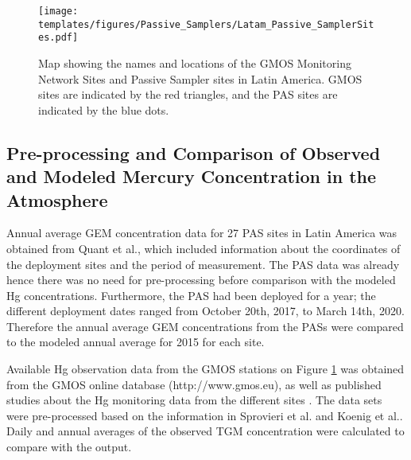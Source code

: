 \begin{figure}[H]
 \centering
  \texttt{[image: templates/figures/Passive\_Samplers/Latam\_Passive\_SamplerSites.pdf]}
  \caption[Map showing the names and locations of the GMOS Monitoring Network Sites and Passive Sampler sites in Latin America.]{Map showing the names and locations of the GMOS Monitoring Network Sites and Passive Sampler sites in Latin America. GMOS sites are indicated by the red triangles, and the PAS sites are indicated by the blue dots\cite{quant_measuring_2021,koenig_seasonal_2021}.}
  \label{fig:Latam_Passive_SamplerSites}
\end{figure}
\FloatBarrier

\subsection{Pre-processing and Comparison of Observed and Modeled Mercury Concentration in the Atmosphere}\label{c2_observation_data_manipulation}
\begin{flushleft}
  Annual average GEM concentration data for 27 PAS sites in Latin America was obtained from Quant et al.\cite{quant_measuring_2021}, which included information about the coordinates of the deployment sites and the period of measurement. The PAS data was already \nang hence there was no need for pre-processing before comparison with the modeled Hg concentrations. Furthermore, the PAS had been deployed for a year; the different deployment dates ranged from October 20th, 2017, to March 14th, 2020. Therefore the annual average GEM concentrations from the PASs were compared to the modeled annual average \hg for 2015 for each site. 
  \end{flushleft}

\begin{flushleft}
  Available Hg observation data from the GMOS stations on Figure  \ref{fig:Latam_Passive_SamplerSites} was obtained from the GMOS online database (http://www.gmos.eu), as well as published studies about the Hg monitoring data from the different sites  \cite{sprovieri_atmospheric_2016,koenig_seasonal_2021}. The data sets were pre-processed based on the information in Sprovieri et al.\cite{sprovieri_atmospheric_2016} and Koenig et al.\cite{koenig_seasonal_2021}. Daily and annual averages of the observed TGM concentration were calculated to compare with the \gc output. 
\end{flushleft}






